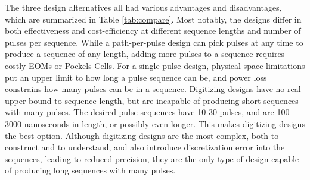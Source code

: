 \documentclass[pdftex,12pt,a4paper]{article}
\begin{document}
The three design alternatives all had various advantages and disadvantages, which are summarized in Table \ref{tab:compare}. Most notably, the designs differ in both effectiveness and cost-efficiency at different sequence lengths and number of pulses per sequence. While a path-per-pulse design can pick pulses at any time to produce a sequence of any length, adding more pulses to a sequence requires costly EOMs or Pockels Cells. For a single pulse design, physical space limitations put an upper limit to how long a pulse sequence can be, and power loss constrains how many pulses can be in a sequence. Digitizing designs have no real upper bound to sequence length, but are incapable of producing short sequences with many pulses. The desired pulse sequences have 10-30 pulses, and are 100-3000 nanoseconds in length, or possibly even longer. This makes digitizing designs the best option. Although digitizing designs are the most complex, both to construct and to understand, and also introduce discretization error into the sequences, leading to reduced precision, they are the only type of design capable of producing long sequences with many pulses.
\end{document}

